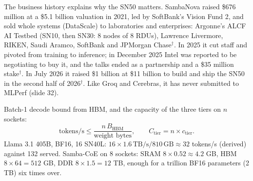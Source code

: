 \documentclass[11pt,letterpaper]{article}
\newenvironment{formulas}{\begin{tcolorbox}[formulabox]}{\end{tcolorbox}}
\begin{document}
The business history explains why the SN50 matters. SambaNova raised \$676 million at a \$5.1 billion valuation in 2021, led by SoftBank's Vision Fund 2, and sold whole systems (DataScale) to laboratories and enterprises: Argonne's ALCF AI Testbed (SN10, then SN30: 8 nodes of 8 RDUs), Lawrence Livermore, RIKEN, Saudi Aramco, SoftBank and JPMorgan Chase$^\dagger$. In 2025 it cut staff and pivoted from training to inference; in December 2025 Intel was reported to be negotiating to buy it, and the talks ended as a partnership and a \$35 million stake$^\dagger$. In July 2026 it raised \$1 billion at \$11 billion to build and ship the SN50 in the second half of 2026$^\dagger$. Like Groq and Cerebras, it has never submitted to MLPerf (slide 32).

\begin{formulas}
Batch-1 decode bound from HBM, and the capacity of the three tiers on $n$ sockets:
\[
\text{tokens/s}\le\frac{n\,B_{\text{HBM}}}{\text{weight bytes}},\qquad
C_{\text{tier}} = n\times c_{\text{tier}} .
\]
Llama 3.1 405B, BF16, 16 SN40L: $16\times1.6\,\text{TB/s}/810\,\text{GB}\approx 32$ tokens/s (derived) against 132 served. Samba-CoE on 8 sockets: SRAM $8\times0.52\approx4.2$ GB, HBM $8\times64=512$ GB, DDR $8\times1.5=12$ TB, enough for a trillion BF16 parameters (2 TB) six times over.
\end{formulas}
\end{document}
